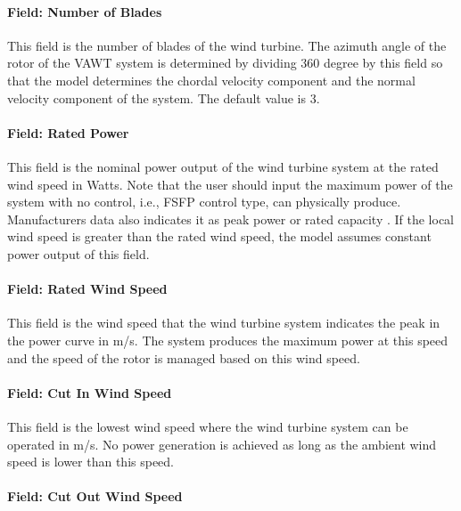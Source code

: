 \paragraph{Field: Number of Blades}\label{field-number-of-blades}

This field is the number of blades of the wind turbine. The azimuth angle of the rotor of the VAWT system is determined by dividing 360 degree by this field so that the model determines the chordal velocity component and the normal velocity component of the system. The default value is 3.

\paragraph{Field: Rated Power}\label{field-rated-power}

This field is the nominal power output of the wind turbine system at the rated wind speed in Watts. Note that the user should input the maximum power of the system with no control, i.e., FSFP control type, can physically produce. Manufacturers data also indicates it as peak power or rated capacity . If the local wind speed is greater than the rated wind speed, the model assumes constant power output of this field.

\paragraph{Field: Rated Wind Speed}\label{field-rated-wind-speed}

This field is the wind speed that the wind turbine system indicates the peak in the power curve in m/s. The system produces the maximum power at this speed and the speed of the rotor is managed based on this wind speed.

\paragraph{Field: Cut In Wind Speed}\label{field-cut-in-wind-speed}

This field is the lowest wind speed where the wind turbine system can be operated in m/s. No power generation is achieved as long as the ambient wind speed is lower than this speed.

\paragraph{Field: Cut Out Wind Speed}\label{field-cut-out-wind-speed}

